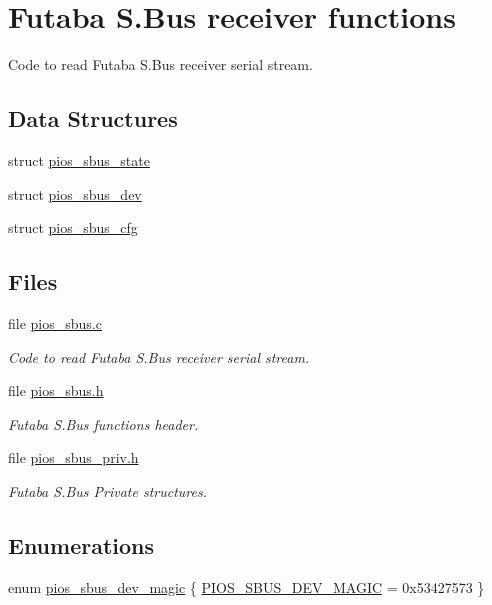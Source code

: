 \hypertarget{group___p_i_o_s___s_bus}{\section{\-Futaba \-S.\-Bus receiver functions}
\label{group___p_i_o_s___s_bus}
}


\-Code to read \-Futaba \-S.\-Bus receiver serial stream.  


\subsection*{\-Data \-Structures}
\begin{DoxyCompactItemize}
\item 
struct \hyperlink{structpios__sbus__state}{pios\-\_\-sbus\-\_\-state}
\item 
struct \hyperlink{structpios__sbus__dev}{pios\-\_\-sbus\-\_\-dev}
\item 
struct \hyperlink{structpios__sbus__cfg}{pios\-\_\-sbus\-\_\-cfg}
\end{DoxyCompactItemize}
\subsection*{\-Files}
\begin{DoxyCompactItemize}
\item 
file \hyperlink{pios__sbus_8c}{pios\-\_\-sbus.\-c}
\begin{DoxyCompactList}\small\item\em \-Code to read \-Futaba \-S.\-Bus receiver serial stream. \end{DoxyCompactList}\item 
file \hyperlink{pios__sbus_8h}{pios\-\_\-sbus.\-h}
\begin{DoxyCompactList}\small\item\em \-Futaba \-S.\-Bus functions header. \end{DoxyCompactList}\item 
file \hyperlink{pios__sbus__priv_8h}{pios\-\_\-sbus\-\_\-priv.\-h}
\begin{DoxyCompactList}\small\item\em \-Futaba \-S.\-Bus \-Private structures. \end{DoxyCompactList}\end{DoxyCompactItemize}
\subsection*{\-Enumerations}
\begin{DoxyCompactItemize}
\item 
enum \hyperlink{group___p_i_o_s___s_bus_ga595ee1f903af9c4166426f9cc144b36c}{pios\-\_\-sbus\-\_\-dev\-\_\-magic} \{ \hyperlink{group___p_i_o_s___s_bus_gga595ee1f903af9c4166426f9cc144b36ca326080b9f0c57625a4ce55bd5cd91d66}{\-P\-I\-O\-S\-\_\-\-S\-B\-U\-S\-\_\-\-D\-E\-V\-\_\-\-M\-A\-G\-I\-C} =  0x53427573
 \}
\end{DoxyCompactItemize}
